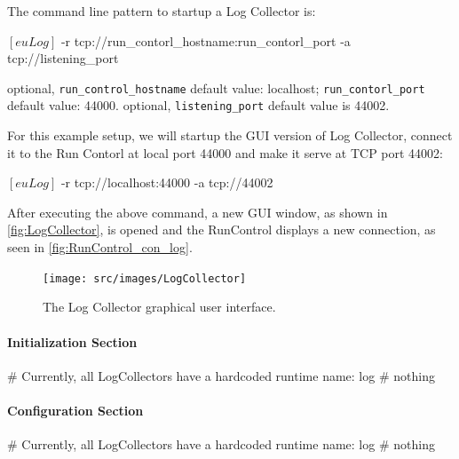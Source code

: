 The command line pattern to startup a Log Collector is:
\begin{listing}[mybash]
$[euLog]$ -r tcp://{run_contorl_hostname}:{run_contorl_port} -a tcp://{listening_port}
\end{listing}

\begin{description}
optional, \texttt{run\_control\_hostname} default value: localhost;  \texttt{run\_contorl\_port}  default value: 44000.
optional, \texttt{listening\_port} default value is 44002.
\end{description}

For this example setup, we will startup the GUI version of Log Collector, connect it to the Run Contorl at local port 44000 and make it serve at TCP port 44002:\\
\begin{listing}[mybash]
$[euLog]$ -r tcp://localhost:44000 -a tcp://44002
\end{listing}

After executing the above command, a new GUI window, as shown in \autoref{fig:LogCollector}, is opened and the RunControl displays a new connection, as seen in \autoref{fig:RunControl_con_log}.
\begin{figure}[htb]
  \begin{center}
    \texttt{[image: src/images/LogCollector]}
    \caption{The Log Collector graphical user interface.}
    \label{fig:LogCollector}
  \end{center}
\end{figure}


\paragraph{Initialization Section}
\begin{listing}
# Currently, all LogCollectors have a hardcoded runtime name: log
# nothing
\end{listing}

\paragraph{Configuration Section}
\begin{listing}
# Currently, all LogCollectors have a hardcoded runtime name: log
# nothing
\end{listing}

